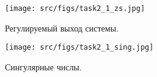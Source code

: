   \begin{figure}[ht!]
    \centering
    \texttt{[image: src/figs/task2\_1\_zs.jpg]}
    \caption{Регулируемый выход системы.}
    \label{fig:task2_1_zs}
  \end{figure}
  
  \begin{figure}[ht!]
    \centering
    \texttt{[image: src/figs/task2\_1\_sing.jpg]}
    \caption{Сингулярные числы.}
    \label{fig:task2_1_sing}
  \end{figure}
  
  \FloatBarrier